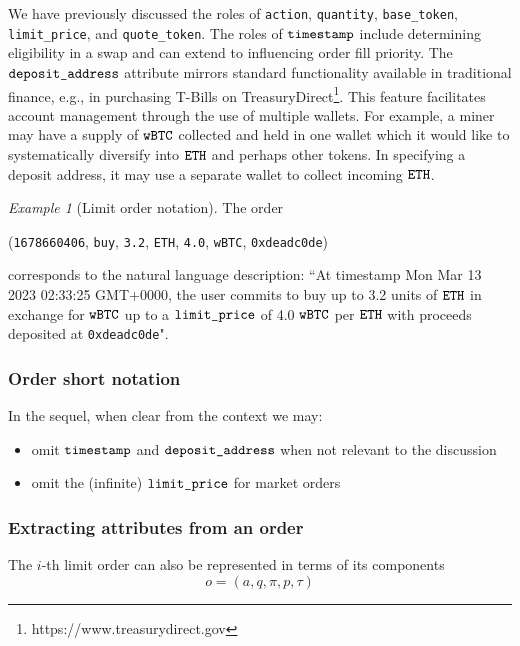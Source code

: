 \documentclass[11pt, reqno]{amsart}
\theoremstyle{definition}
\theoremstyle{remark}
\newtheorem{exmp}{Example}[subsection]
\newcommand{\BTC}{\textnormal{\texttt{wBTC}}}
\newcommand{\ETH}{\textnormal{\texttt{ETH}}}
\newcommand{\timestamp}{\textnormal{\texttt{timestamp}}}
\newcommand{\action}{\textnormal{\texttt{action}}}
\newcommand{\quantity}{\textnormal{\texttt{quantity}}}
\newcommand{\basetoken}{\textnormal{\texttt{base\_token}}}
\newcommand{\limitprice}{\textnormal{\texttt{limit\_price}}}
\newcommand{\quotetoken}{\textnormal{\texttt{quote\_token}}}
\newcommand{\depositaddress}{\textnormal{\texttt{deposit\_address}}}
\newcommand{\buy}{\textnormal{\texttt{buy}}}
\begin{document}
We have previously discussed the roles of \action, \quantity, \basetoken,
\limitprice, and \quotetoken.
The roles of $\timestamp$ include determining eligibility in a swap and can
extend to influencing order fill priority.
The $\depositaddress$ attribute mirrors standard functionality
available in traditional finance, e.g., in purchasing T-Bills on
TreasuryDirect\footnote{https://www.treasurydirect.gov}. This feature
facilitates account management through the use of multiple wallets. For
example, a miner may have a supply of $\BTC$ collected and held in one wallet
which it would like to systematically diversify into $\ETH$ and perhaps other
tokens. In specifying a deposit address, it may use a separate wallet to collect
incoming $\ETH$.

\begin{exmp}[Limit order notation]
The order
\begin{center}
(\textnormal{\texttt{1678660406}},
\buy,
\textnormal{\texttt{3.2}},
\ETH,
\textnormal{\texttt{4.0}},
\BTC,
\textnormal{\texttt{0xdeadc0de}})
\end{center}
corresponds to the natural language description:
``At timestamp Mon Mar 13 2023 02:33:25 GMT+0000, the user commits to buy up to
3.2 units of $\ETH$ in exchange for $\BTC$ up to a $\limitprice$ of 4.0
$\BTC$ per $\ETH$ with proceeds deposited at \textnormal{\texttt{0xdeadc0de}}".
\end{exmp}

\subsubsection{Order short notation}
In the sequel, when clear from the context we may:
\begin{itemize}
\item omit $\timestamp$ and $\depositaddress$ when not relevant to the
      discussion
\item omit the (infinite) $\limitprice$ for market orders
\end{itemize}

\subsubsection{Extracting attributes from an order}
The $i$-th limit order can also be represented in terms of its components
\[
	o = (a, q, \pi, p, \tau)
\]
\end{document}
